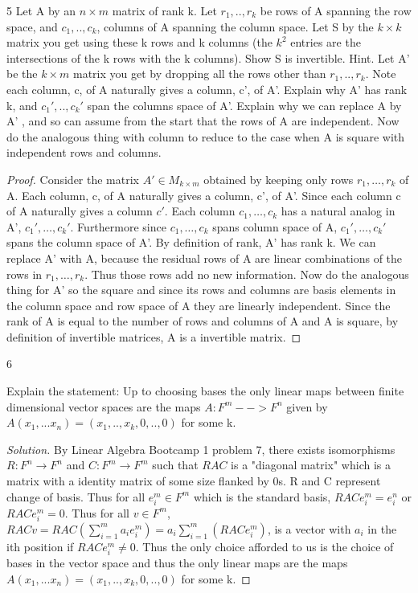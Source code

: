 \documentclass{article}
\newcommand{\rarr}[0]{\rightarrow}
\newenvironment{solution}
{\renewcommand\qedsymbol{$\blacksquare$}\begin{proof}[Solution]}
		{\end{proof}}
\begin{document}
\begin{PROB}{5}\label{Problem 5.}
	Let A by an $n \times m$ matrix of rank k. Let $r_1,..,r_k$ be rows of A spanning the row space, and $c_1,..,c_k$, columns of A spanning the column space. Let S by the $k \times k$ matrix you get using these k rows and k columns (the $k^2$ entries are the intersections of the k rows with the k columns).
	Show S is invertible. Hint. Let A' be the  $k \times m$ matrix you get by dropping all the rows other than $r_1,..,r_k$. Note each column, c, of A naturally gives a column, c', of A'. Explain why A' has rank k,
	and $c_1',..,c_k'$ span the columns space of A'.  Explain why we can replace A by A' , and so can assume from the start that the rows of A are independent. Now do the analogous thing with column to reduce
	to the case when A is square with independent rows and columns.
\end{PROB}
\begin{proof}
	Consider the matrix $A' \in M_{k \times m}$ obtained by keeping only rows $r_1, \ldots, r_k$ of A. Each column, c, of A naturally gives a column, c', of A'. Since each column c of A naturally gives a column $c'$. Each column $c_1, \ldots, c_k$ has a natural analog in A', $c_1', \ldots, c_k'$. Furthermore since $c_1, \ldots, c_k$ spans column space of A, $c_1', \ldots, c_k'$ spans the column space of A'. By definition of rank, A' has rank k. We can replace A' with A, because the residual rows of A are linear combinations of the rows in $r_1, \ldots, r_k$. Thus those rows add no new information. Now do the analogous thing for A' so the square and since its rows and columns are basis elements in the column space and row space of A they are linearly independent. Since the rank of A is equal to the number of rows and columns of A and A is square, by definition of invertible matrices, A is a invertible matrix.
\end{proof}

\bigskip

\begin{PROB}{6}\label{Problem 6.}

	Explain the statement: Up to choosing bases the only linear maps between finite dimensional vector spaces are the maps $A: F^m --> F^n$ given by $A(x_1,...x_n) = (x_1,..,x_k,0,..,0)$ for some k.

\end{PROB}
\begin{solution}
	By Linear Algebra Bootcamp 1 problem 7, there exists isomorphisms $R: F^n \rarr F^n$ and $C: F^m \rarr F^m$ such that $RAC$ is a "diagonal matrix" which is a matrix with a identity matrix of some size flanked by 0s. R and C represent change of basis. Thus for all $e^m_i \in F^m$ which is the standard basis, $RACe^m_i = e^n_i$ or $RACe^m_i = 0$. Thus for all $v \in F^m $, $RACv = RAC(\sum_{i=1}^{m}a_ie_i^m) = a_i\sum_{i=1}^m(RACe_i^m)$, is a vector with $a_i$ in the ith position if $RACe_i^m \neq 0$. Thus the only choice afforded to us is the choice of bases in the vector space and thus the only linear maps are the maps $A(x_1,...x_n) = (x_1,..,x_k,0,..,0)$ for some k.
\end{solution}
\end{document}
